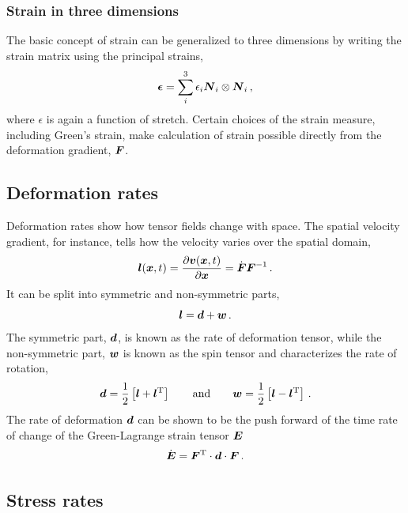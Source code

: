 \documentclass[10pt,letterpaper,oneside]{report}
\newcommand{\ten}[1]{\mbox{\boldmath $#1$}{}}
\newcommand{\scas}[1]{\mbox{{\scriptsize{${\rm{#1}}$}}}{}}
\begin{document}
\subsubsection{Strain in three dimensions}
The basic concept of strain can be generalized to three dimensions by writing the strain matrix using the principal strains, 
\begin{equation}
\ten{ \epsilon } = \sum_i^3 \epsilon_i \ten{N}_i \otimes \ten{N}_i \, ,
\end{equation}
where $\epsilon$ is again a function of stretch.  Certain choices of the strain measure, including Green's strain, make calculation of strain possible directly from the deformation gradient, $\ten{F}$.  

\subsection{Deformation rates}

Deformation rates show how tensor fields change with space.  The spatial velocity gradient, for instance, tells how the velocity varies over the spatial domain, 
\begin{equation}
\ten{l} (\ten{x}, t) 
= \frac{\partial \ten{v} (\ten{x}, t) }{\partial\ten{x} } 
= \dot{\ten{F}} \ten{F}^{-1} \, . 
\end{equation}
It can be split into symmetric and non-symmetric parts, 
\begin{equation}
\ten{l} = \ten{d} + \ten{w} \, . 
\end{equation}
The symmetric part, $\ten{d}$, is known as the rate of deformation tensor, while the non-symmetric part, $\ten{w}$ is known as the spin tensor and characterizes the rate of rotation,
\begin{equation}
\ten{d} = \frac{1}{2} \left[ \ten{l} + \ten{l}^{\scas{T}} \right] 
\qquad \text{and} \qquad
\ten{w} = \frac{1}{2} \left[ \ten{l} - \ten{l}^{\scas{T}} \right] \, . 
\end{equation}
The rate of deformation $\ten{d}$ can be shown to be the push forward of the time rate of change of the Green-Lagrange strain tensor $\ten{E}$
\begin{equation}
\dot{\ten{E}} = \ten{F}^{\scas{T}} \cdot \ten{d} \cdot \ten{F} \, .
\end{equation}


\subsection{Stress rates}
\end{document}
